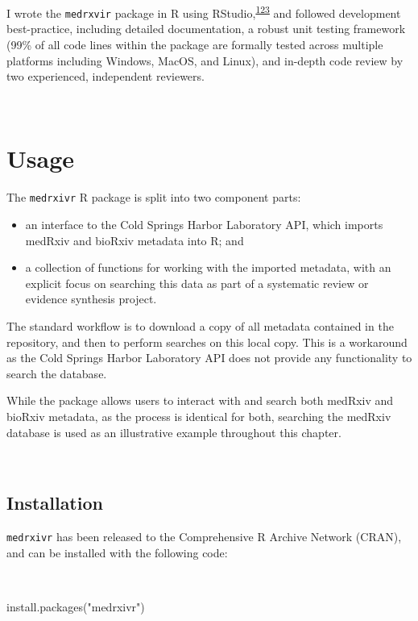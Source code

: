 \documentclass[a4paper, twoside]{templates/ociamthesis}
\providecommand{\tightlist}{%
  \setlength{\itemsep}{0pt}\setlength{\parskip}{0pt}}
\newenvironment{Shaded}{\begin{snugshade}}{\end{snugshade}}
\newcommand{\FunctionTok}[1]{\textcolor[rgb]{0.00,0.00,0.00}{#1}}
\newcommand{\NormalTok}[1]{#1}
\newcommand{\StringTok}[1]{\textcolor[rgb]{0.31,0.60,0.02}{#1}}
\renewenvironment{Shaded}
{
  \vspace{4pt}%
  \begin{snugshade}%
}{%
  \end{snugshade}%
  \vspace{4pt}%
}
\begin{document}
I wrote the \texttt{medrxvir} package in R using RStudio,\textsuperscript{\protect\hyperlink{ref-rcoreteam2019}{123}} and followed development best-practice, including detailed documentation, a robust unit testing framework (99\% of all code lines within the package are formally tested across multiple platforms including Windows, MacOS, and Linux), and in-depth code review by two experienced, independent reviewers.

~

\hypertarget{usage}{%
\section{Usage}\label{usage}}

The \texttt{medrxivr} R package is split into two component parts:

\begin{itemize}
\tightlist
\item
  an interface to the Cold Springs Harbor Laboratory API, which imports medRxiv and bioRxiv metadata into R; and
\item
  a collection of functions for working with the imported metadata, with an explicit focus on searching this data as part of a systematic review or evidence synthesis project.
\end{itemize}

The standard workflow is to download a copy of all metadata contained in the repository, and then to perform searches on this local copy. This is a workaround as the Cold Springs Harbor Laboratory API does not provide any functionality to search the database.

While the package allows users to interact with and search both medRxiv and bioRxiv metadata, as the process is identical for both, searching the medRxiv database is used as an illustrative example throughout this chapter.

~

\hypertarget{installation}{%
\subsection{Installation}\label{installation}}

\texttt{medrxivr} has been released to the Comprehensive R Archive Network (CRAN), and can be installed with the following code:

~

\begin{Shaded}
\begin{Highlighting}[]
\FunctionTok{install.packages}\NormalTok{(}\StringTok{"medrxivr"}\NormalTok{)}
\end{Highlighting}
\end{Shaded}
\end{document}
